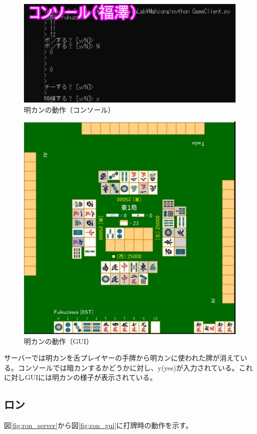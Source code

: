 \documentclass[a4j,titlepage]{jsarticle}
\begin{document}
\begin{figure}[htbp]
  \centering
  \includegraphics[width = 0.8\linewidth]{images/minkan_console.png}
  \caption{明カンの動作（コンソール）}
  \label{fig:minkan_console}
\end{figure}

\begin{figure}[htbp]
  \centering
  \includegraphics[width = 0.8\linewidth]{images/minkan_gui.png}
  \caption{明カンの動作（GUI）}
  \label{fig:minkan_gui}
\end{figure}

サーバーでは明カンを舌プレイヤーの手牌から明カンに使われた牌が消えている。コンソールでは暗カンするかどうかに対し、y(yes)が入力されている。これに対しGUIには明カンの様子が表示されている。

\subsection{ロン}
図\ref{fig:ron_server}から図\ref{fig:ron_gui}に打牌時の動作を示す。
\end{document}
